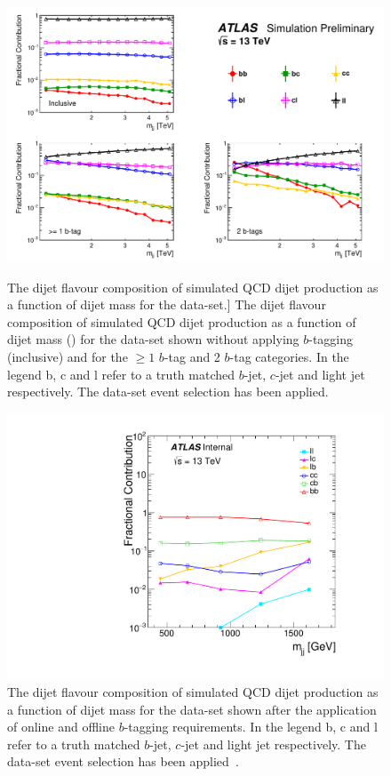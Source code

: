 \begin{figure}[!hb]
  \begin{center}
    \includegraphics[width=0.88\linewidth, angle=0]{figs/Dibjet/ICHEP/evt-summer_flavcomp.pdf}
  \end{center}
  \vspace{-1.25em}
  \caption
      [The dijet flavour composition of simulated QCD dijet production as a function of dijet mass for the \summer{} data-set.]
      {The dijet flavour composition of simulated QCD dijet production as a function of dijet mass (\mjj{}) for the \summer{} data-set
        shown without applying $b$-tagging (inclusive) and for the $\geq1$ $b$-tag and 2 $b$-tag categories.
        In the legend b, c and l refer to a truth matched $b$-jet, $c$-jet and light jet respectively.
        The \summer{} data-set event selection has been applied.}
      \label{fig:evt-summer_flavcomp}
  \begin{center}
    \includegraphics[width=0.43\linewidth, angle=0]{figs/Dibjet/LowMass/evt-flavcomp.pdf}
  \end{center}
  \vspace{-1.25em}
  \caption[The dijet flavour composition of simulated QCD dijet production as a function of dijet mass for the \lm{} data-set.]
          {The dijet flavour composition of simulated QCD dijet production as a function of dijet mass for the \lm{} data-set
            shown after the application of online and offline $b$-tagging requirements.
            In the legend b, c and l refer to a truth matched $b$-jet, $c$-jet and light jet respectively.
            The \lm{} data-set event selection has been applied~\cite{dibjet-full_int}.}
  \label{fig:evt-lowmass_flavcomp}
\end{figure}


